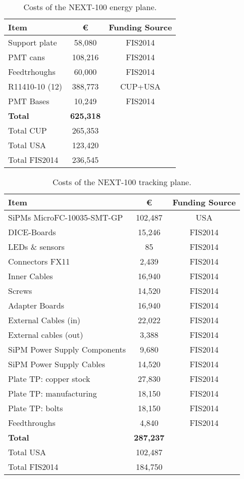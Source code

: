 \begin{table}[h!]
\begin{center}
\begin{tabular}{|l|c|c|}
\hline
 Item & \euro & Funding Source \\
 \hline
Support plate	&	58,080 &	FIS2014 \\
PMT cans &	108,216 &	FIS2014 \\
Feedtrhoughs &	60,000 & FIS2014 \\
R11410-10 (12) &	388,773	& CUP+USA \\
PMT Bases &		10,249 &	FIS2014 \\
  \hline
{\bf Total}	&	{\bf 625,318}	& \\
Total CUP	&	265,353	&\\
Total USA	&	123,420 & \\
Total FIS2014	&	236,545 & \\	
 \hline\hline
\end{tabular}  
\caption{Costs of the NEXT-100 energy plane.}
\label{tab.n100:EP}
\end{center}
\end{table}

\begin{table}[h!]
\begin{center}
\begin{tabular}{|l|c|c|}
\hline
 Item & \euro & Funding Source \\
 \hline
SiPMs MicroFC-10035-SMT-GP & 102,487 & USA \\
DICE-Boards &15,246 & FIS2014 \\
LEDs \& sensors &	85 & FIS2014 \\
Connectors FX11 & 2,439 & FIS2014 \\
Inner Cables & 16,940 & FIS2014 \\
Screws	& 14,520 & FIS2014 \\
Adapter Boards	 &	16,940 & FIS2014 \\
External Cables (in) &	22,022 & FIS2014 \\
External cables  (out) & 3,388 & FIS2014 \\
SiPM Power Supply Components & 9,680 & FIS2014 \\
SiPM Power Supply Cables &	14,520 & FIS2014 \\
Plate  TP:  copper stock &  27,830 & FIS2014 \\
Plate  TP:  manufacturing & 18,150 & FIS2014 \\
Plate  TP:  bolts & 	18,150 & FIS2014 \\
Feedthroughs & 4,840 & FIS2014 \\
  \hline
{\bf Total}	&	{\bf 287,237 }	& \\
  Total USA	&	102,487 	& \\
   Total FIS2014	&	184,750 	& \\
 \hline\hline
\end{tabular}  
\caption{Costs of the NEXT-100 tracking plane.}
\label{tab.n100:TP}
\end{center}
\end{table} 

